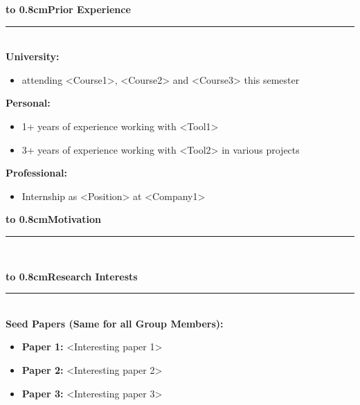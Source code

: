 \documentclass[
    USenglish,
    accentcolor=3b,
]{tudaexercise}
\newcommand{\fat}[1]{{\Large\textbf{\textcolor{accentcolor}{\textsf{#1}}}}}
\newcommand{\iconpsection}[2]{%
    \mbox{}\fat{\hbox to 0.8cm{#1}#2}%
    \vspace{-1.2em}\par\noindent\rule{\textwidth}{0.4pt}\\[1em]
}
\newcommand{\seedpapers}{
    \begin{defBox}
        \begin{itemize}
            \item \textbf{Paper 1:} <Interesting paper 1>
            \item \textbf{Paper 2:} <Interesting paper 2>
            \item \textbf{Paper 3:} <Interesting paper 3>
        \end{itemize}
    \end{defBox}
}
\begin{document}
    \iconpsection{\faGraduationCap}{Prior Experience}
    \textbf{University:}
    \begin{itemize}
        \item attending <Course1>, <Course2> and <Course3> this semester
    \end{itemize}
    \textbf{Personal:}
    \begin{itemize}
        \item 1+ years of experience working with <Tool1>
        \item 3+ years of experience working with <Tool2> in various projects
    \end{itemize}
    \textbf{Professional:}
    \begin{itemize}
        \item Internship as <Position> at <Company1>
    \end{itemize}
    \iconpsection{\faClipboard}{Motivation}
    \lipsum[1]

    \iconpsection{\faBook}{Research Interests}
    \textbf{Seed Papers (Same for all Group Members):}
    \seedpapers{}
\end{document}
